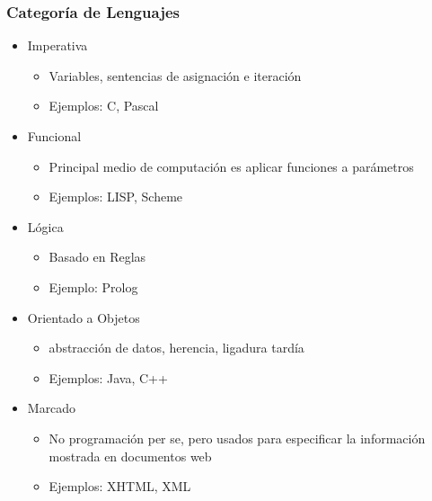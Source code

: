 \documentclass[11pt]{article}
\begin{document}
\subsubsection*{Categoría de Lenguajes}
\label{sec:orgheadline12}
\begin{itemize}
\item Imperativa
\begin{itemize}
\item Variables, sentencias de asignación e iteración
\item Ejemplos: C, Pascal
\end{itemize}
\item Funcional
\begin{itemize}
\item Principal medio de computación es aplicar funciones a parámetros
\item Ejemplos: LISP, Scheme
\end{itemize}
\item Lógica
\begin{itemize}
\item Basado en Reglas
\item Ejemplo: Prolog
\end{itemize}
\item Orientado a Objetos
\begin{itemize}
\item abstracción de datos, herencia, ligadura tardía
\item Ejemplos: Java, C++
\end{itemize}
\item Marcado
\begin{itemize}
\item No programación per se, pero usados para especificar la
información mostrada en documentos web
\item Ejemplos: XHTML, XML
\end{itemize}
\end{itemize}
\end{document}
